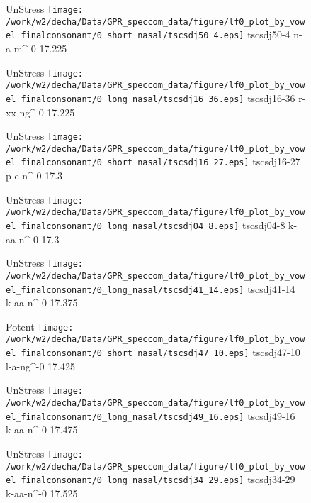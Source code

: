 \documentclass{article}
\begin{document}
\begin{figure}[t]
\begin{minipage}[b]{.24\textwidth}
UnStress
\centering
\texttt{[image: /work/w2/decha/Data/GPR\_speccom\_data/figure/lf0\_plot\_by\_vowel\_finalconsonant/0\_short\_nasal/tscsdj50\_4.eps]}
tscsdj50-4 n-a-m\textasciicircum-0 17.225
\end{minipage}
\begin{minipage}[b]{.24\textwidth}
UnStress
\centering
\texttt{[image: /work/w2/decha/Data/GPR\_speccom\_data/figure/lf0\_plot\_by\_vowel\_finalconsonant/0\_long\_nasal/tscsdj16\_36.eps]}
tscsdj16-36 r-xx-ng\textasciicircum-0 17.225
\end{minipage}
\begin{minipage}[b]{.24\textwidth}
UnStress
\centering
\texttt{[image: /work/w2/decha/Data/GPR\_speccom\_data/figure/lf0\_plot\_by\_vowel\_finalconsonant/0\_short\_nasal/tscsdj16\_27.eps]}
tscsdj16-27 p-e-n\textasciicircum-0 17.3
\end{minipage}
\begin{minipage}[b]{.24\textwidth}
UnStress
\centering
\texttt{[image: /work/w2/decha/Data/GPR\_speccom\_data/figure/lf0\_plot\_by\_vowel\_finalconsonant/0\_long\_nasal/tscsdj04\_8.eps]}
tscsdj04-8 k-aa-n\textasciicircum-0 17.3
\end{minipage}
\end{figure}
\clearpage
\begin{figure}[t]
\begin{minipage}[b]{.24\textwidth}
UnStress
\centering
\texttt{[image: /work/w2/decha/Data/GPR\_speccom\_data/figure/lf0\_plot\_by\_vowel\_finalconsonant/0\_long\_nasal/tscsdj41\_14.eps]}
tscsdj41-14 k-aa-n\textasciicircum-0 17.375
\end{minipage}
\begin{minipage}[b]{.24\textwidth}
\colorbox{Apricot}{Potent}
\centering
\texttt{[image: /work/w2/decha/Data/GPR\_speccom\_data/figure/lf0\_plot\_by\_vowel\_finalconsonant/0\_short\_nasal/tscsdj47\_10.eps]}
tscsdj47-10 l-a-ng\textasciicircum-0 17.425
\end{minipage}
\begin{minipage}[b]{.24\textwidth}
UnStress
\centering
\texttt{[image: /work/w2/decha/Data/GPR\_speccom\_data/figure/lf0\_plot\_by\_vowel\_finalconsonant/0\_long\_nasal/tscsdj49\_16.eps]}
tscsdj49-16 k-aa-n\textasciicircum-0 17.475
\end{minipage}
\begin{minipage}[b]{.24\textwidth}
UnStress
\centering
\texttt{[image: /work/w2/decha/Data/GPR\_speccom\_data/figure/lf0\_plot\_by\_vowel\_finalconsonant/0\_long\_nasal/tscsdj34\_29.eps]}
tscsdj34-29 k-aa-n\textasciicircum-0 17.525
\end{minipage}
\end{figure}
\end{document}
